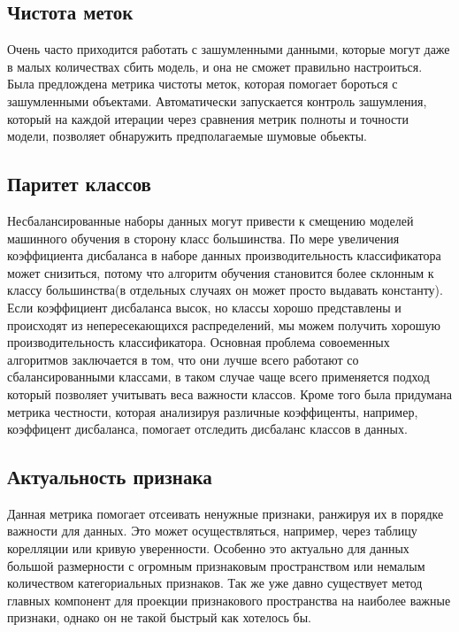 \documentclass{article}
\begin{document}
\subsection{Чистота меток}

Очень часто приходится работать с зашумленными данными, которые могут даже в малых количествах сбить модель, и она не сможет правильно настроиться. Была предлождена метрика чистоты меток, которая помогает бороться с зашумленными объектами. Автоматически запускается контроль зашумления, который на каждой итерации через сравнения метрик полноты и точности модели, позволяет обнаружить предполагаемые шумовые обьекты.

\subsection{Паритет классов}

Несбалансированные наборы данных могут привести к смещению моделей машинного обучения в сторону класс большинства. По мере увеличения коэффициента дисбаланса в наборе данных производительность классификатора может снизиться, потому что алгоритм обучения становится более склонным к классу большинства(в отдельных случаях он может просто выдавать константу).  Если коэффициент дисбаланса высок, но классы хорошо представлены и происходят из непересекающихся распределений, мы можем получить хорошую производительность классификатора. Основная проблема совоеменных алгоритмов заключается в том, что они лучше всего работают со сбалансированными классами, в таком случае чаще всего применяется подход который позволяет учитывать веса важности классов. Кроме того была придумана метрика честности, которая анализируя различные коэффиценты, например, коэффицент дисбаланса, помогает отследить дисбаланс классов в данных.

\subsection{Актуальность признака}

Данная метрика помогает отсеивать ненужные признаки, ранжируя их в порядке важности для данных. Это может осуществляться, например, через таблицу корелляции или кривую уверенности. Особенно это актуально для данных большой размерности с огромным признаковым пространством или немалым количеством категориальных признаков. Так же уже давно существует метод главных компонент для проекции признакового пространства на наиболее важные признаки, однако он не такой быстрый как хотелось бы.
\end{document}
